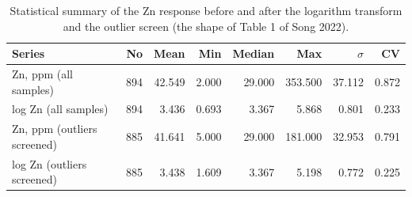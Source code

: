 \begin{table}[t]\centering
\caption{Statistical summary of the Zn response before and after the logarithm transform and the outlier screen (the shape of Table 1 of Song 2022).}\label{tab:response}
\begin{tabular}{lrrrrrrr}
\hline
Series & No & Mean & Min & Median & Max & $\sigma$ & CV \\
\hline
Zn, ppm (all samples) & 894 & 42.549 & 2.000 & 29.000 & 353.500 & 37.112 & 0.872 \\
log Zn (all samples) & 894 & 3.436 & 0.693 & 3.367 & 5.868 & 0.801 & 0.233 \\
Zn, ppm (outliers screened) & 885 & 41.641 & 5.000 & 29.000 & 181.000 & 32.953 & 0.791 \\
log Zn (outliers screened) & 885 & 3.438 & 1.609 & 3.367 & 5.198 & 0.772 & 0.225 \\
\hline
\end{tabular}\end{table}
